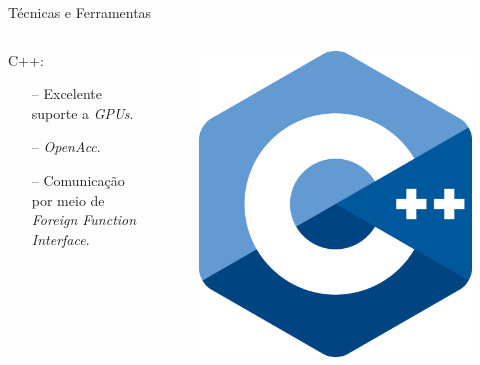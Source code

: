
\begin{frame}{Técnicas e Ferramentas}
    \begin{columns}
    \begin{column}{0.9\textwidth}
    C++:
    \begin{itemize}
        \item[--] Excelente suporte a \textit{GPUs}.
        \item[--] \textit{OpenAcc}.
        \item[--] Comunicação por meio de \textit{Foreign Function Interface}.
    \end{itemize}
    \end{column}

    \begin{column}{0.1\textwidth}
        \begin{figure}
            \includegraphics[width=\textwidth]{Figuras/C++ Logo.png}
        \end{figure}
    \end{column}
    \end{columns}
\end{frame}

